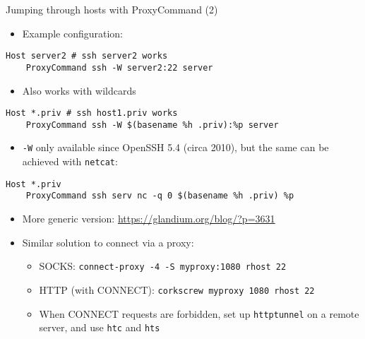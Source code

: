 \documentclass[11pt,final,usepdftitle=false]{beamer}
\begin{document}
\begin{frame}[fragile]{Jumping through hosts with ProxyCommand (2)}
	\hbr
\begin{itemize}
\item Example configuration:
\end{itemize}\vspace{-0.8em}
\begin{lstlisting}[basicstyle=\ttfamily\small,escapeinside={||}]
Host server2 # ssh server2 works
    ProxyCommand ssh -W server2:22 server
\end{lstlisting}\vspace{-0.2em}
\hbr
\begin{itemize}
\item Also works with wildcards
\end{itemize}\vspace{-0.8em}
\begin{lstlisting}[basicstyle=\ttfamily\small,escapeinside={||}]
Host *.priv # ssh host1.priv works
    ProxyCommand ssh -W $(basename %h .priv):%p server
\end{lstlisting}\vspace{-0.2em}
\begin{itemize}
	\item \texttt{-W} only available since OpenSSH 5.4 (circa 2010), but the same can be achieved with \texttt{netcat}:
\end{itemize}\vspace{-0.8em}
\begin{lstlisting}[basicstyle=\ttfamily\small,escapeinside={||}]
Host *.priv
    ProxyCommand ssh serv nc -q 0 $(basename %h .priv) %p
\end{lstlisting}\vspace{-0.2em}
\begin{itemize}
\item More generic version: \url{https://glandium.org/blog/?p=3631}
\hbr
\item Similar solution to connect via a proxy:
\begin{itemize}
	\item SOCKS: \texttt{connect-proxy -4 -S myproxy:1080 rhost 22}
	\item HTTP (with CONNECT): \texttt{corkscrew myproxy 1080 rhost 22}
	\item When CONNECT requests are forbidden, set up \texttt{httptunnel} on a remote server, and use \texttt{htc} and \texttt{hts}
\end{itemize}
\end{itemize}
\end{frame}
\end{document}
